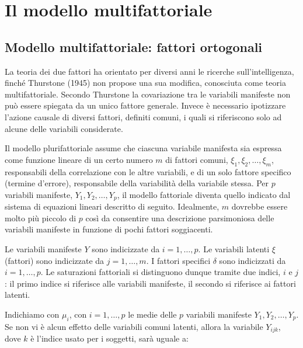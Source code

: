 
\chapter{Il modello multifattoriale}
\label{ch:mod_multifattoriale}


\section{Modello multifattoriale: fattori ortogonali}

La teoria dei due fattori ha orientato per diversi anni le ricerche
sull'intelligenza, finch{\'e} Thurstone (1945) non propose una sua
modifica, conosciuta come teoria multifattoriale. 
Secondo  Thurstone la covariazione tra le variabili manifeste non può  essere spiegata da un unico fattore generale. Invece è necessario ipotizzare l'azione causale di diversi
fattori, definiti comuni, i quali si riferiscono solo ad alcune delle
variabili considerate.

Il modello plurifattoriale assume che ciascuna variabile manifesta sia
espressa come funzione lineare di un certo numero $m$ di fattori
comuni, $\xi_1, \xi_2, \dots, \xi_m$, responsabili della correlazione con le
altre variabili, e di un solo fattore specifico (termine d'errore),
responsabile della variabilit{\`a} della variabile stessa.
Per $p$ variabili manifeste, $Y_1, Y_2, \dots, Y_p$, il modello fattoriale diventa quello indicato dal sistema di equazioni lineari descritto di seguito.  
Idealmente, $m$ dovrebbe essere molto più piccolo di $p$ così da
consentire una descrizione parsimoniosa delle variabili manifeste in
funzione di pochi fattori soggiacenti. 

Le variabili manifeste $Y$ sono indicizzate da $i = 1, \dots, p.$
Le variabili latenti $\xi$ (fattori) sono indicizzate da $j = 1, \dots, m.$ 
I fattori specifici $\delta$ sono indicizzati da $i = 1, \dots, p.$
Le saturazioni fattoriali si distinguono dunque tramite  due indici, $i$ e $j$: il primo indice si riferisce alle variabili manifeste, il secondo si riferisce ai fattori latenti.

Indichiamo con $\mu_i$, con $i=1, \dots, p$ le medie delle $p$ variabili manifeste $Y_1, Y_2, \dots, Y_p$.  
Se non vi è alcun effetto delle variabili comuni latenti, allora la variabile $Y_{ijk}$, dove $k$ è l'indice usato per i soggetti, sarà uguale a:

